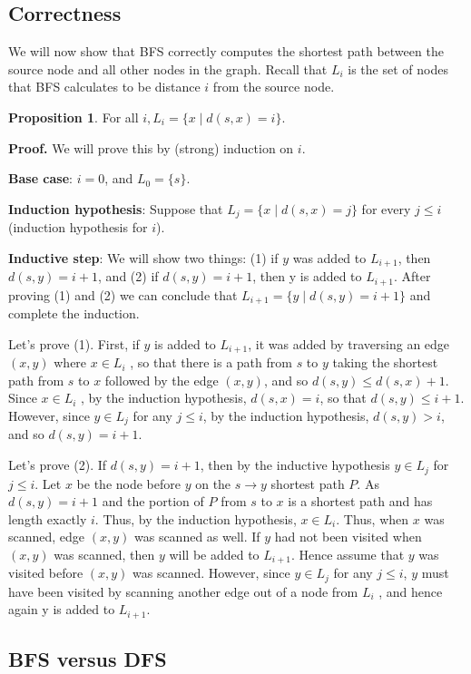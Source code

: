 \documentclass [12pt]{article}
\begin{document}
\subsection{Correctness} 
We will now show that BFS correctly computes the shortest path between the source node and all other nodes in the graph. Recall that $L_i$ is the set of nodes that BFS calculates to be distance $i$ from the source node.
 
\textbf{Proposition 1}. For all $i, L_i = \{x \mid d(s, x) = i\}$.

\textbf{Proof.} We will prove this by (strong) induction on $i$. 

\textbf{Base case}: $i = 0$, and $L_0 = \{s\}$. 

\textbf{Induction hypothesis}: Suppose that $L_j = \{x \mid d(s, x) = j\}$ for every $j \leq i$ (induction hypothesis for $i$). 

\textbf{Inductive step}: We will show two things: (1) if $y$ was added to $L_{i+1}$, then $d(s, y ) = i + 1$, and (2) if $d(s, y ) = i + 1$, then y is added to $L_{i+1}$. After proving (1) and (2) we can conclude that $L_{i+1} = \{y \mid d(s, y ) = i + 1\}$ and complete the induction. 

Let's prove (1). First, if $y$ is added to $L_{i+1}$, it was added by traversing an edge $(x, y )$ where $x \in L_i$ , so that there is a path from $s$ to $y$ taking the shortest path from $s$ to $x$ followed by the edge $(x, y )$, and so $d(s, y ) \leq d(s, x) + 1$. Since $x \in L_i$ , by the induction hypothesis, $d(s, x) = i$, so that $d(s, y ) \leq i + 1$. However, since $y \in L_j$ for any $j \leq i$, by the induction hypothesis, $d(s, y ) > i$, and so $d(s, y ) = i + 1$. 

Let's prove (2). If $d(s, y ) = i + 1$, then by the inductive hypothesis $y \in L_j$ for $j \leq i$. Let $x$ be the node before $y$ on the $s \to y$ shortest path $P$. As $d(s, y ) = i + 1$ and the portion of $P$ from $s $ to $x$ is a shortest path and has length exactly $i$. Thus, by the induction hypothesis, $x \in L_i $. Thus, when $x$ was scanned, edge $(x, y )$ was scanned as well. If $y$ had not been visited when $(x, y )$ was scanned, then $y$ will be added to $L_{i+1}$. Hence assume that $y$ was visited before $(x, y )$ was scanned. However, since $y \in L_j$ for any $j \leq i$, $y$ must have been visited by scanning another edge out of a node from $L_i$ , and hence again y is added to $L_{i+1}$.



\subsection{BFS versus DFS} 
\end{document}
